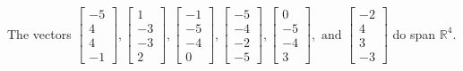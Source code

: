 \begin{exercise}
\begin{exerciseStatement}
  \end{exerciseStatement}
  \begin{exerciseAnswer}
   The vectors \(\left[\begin{array}{r}
-5 \\
4 \\
4 \\
-1
\end{array}\right] , \left[\begin{array}{r}
1 \\
-3 \\
-3 \\
2
\end{array}\right] , \left[\begin{array}{r}
-1 \\
-5 \\
-4 \\
0
\end{array}\right] , \left[\begin{array}{r}
-5 \\
-4 \\
-2 \\
-5
\end{array}\right] , \left[\begin{array}{r}
0 \\
-5 \\
-4 \\
3
\end{array}\right] , \text{ and } \left[\begin{array}{r}
-2 \\
4 \\
3 \\
-3
\end{array}\right]\) 
  	 do  
	span \(\mathbb{R}^4\).
  


  \end{exerciseAnswer}
\end{exercise}
